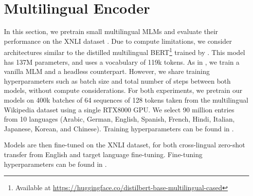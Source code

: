 \section{Multilingual Encoder}
\label{sec:multi_mlm}
In this section, we pretrain small multilingual MLMs and evaluate their performance on the XNLI dataset \citep{conneau2018xnli}. 
%
Due to compute limitations, we consider architectures similar to the distilled multilingual BERT\footnote{Available at \url{https://huggingface.co/distilbert-base-multilingual-cased}} trained by \citet{sanh2019distilbert}. This model has 137M parameters, and uses a vocabulary of 119k tokens. As in , we train a vanilla MLM and a headless counterpart. However, we share training hyperparameters such as batch size and total number of steps between both models, without compute considerations. For both experiments, we pretrain our models on 400k batches of 64 sequences of 128 tokens taken from the multilingual Wikipedia dataset using a single RTX8000 GPU. We select 90 million entries from 10 languages (Arabic, German, English, Spanish, French, Hindi, Italian, Japanese, Korean, and Chinese). Training hyperparameters can be found in .

Models are then fine-tuned on the XNLI dataset, for both cross-lingual zero-shot transfer from English and target language fine-tuning. Fine-tuning hyperparameters can be found in .

\begin{table}[h]
\centering
{}
\caption{Evaluation of multilingual models on the XNLI benchmark. We report dev accuracy, averaged over 3 runs.}
\end{table}

